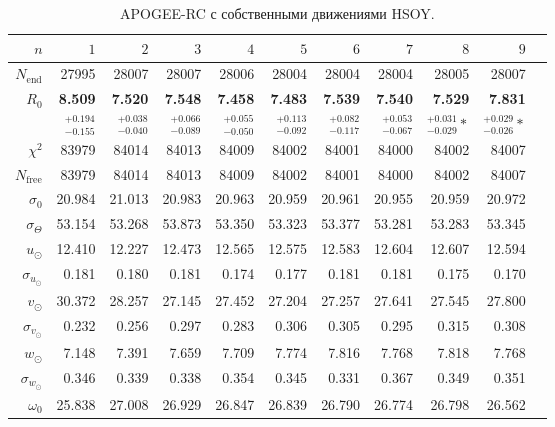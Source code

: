 \documentclass{matmex-diploma-custom}
\begin{document}
\pagebreak
\begin{table}[h!!] \label{table_hsoy_sigma0}
\centering
\caption{APOGEE-RC с собственными движениями HSOY.}
\begin{tabular}{r|rr|r|r|r|rrrrr}
\hline
$n$ & $1$ & $2$ & $3$ & $4$ & $5$&$ 6 $&$ 7 $&$ 8 $&$ 9 $\\\hline
 $N_{\mathrm{end}}$ & 27995       &    28007 &   28007 &   28006 &   28004 &   28004 &    28004 &   28005 &   28007 \\
 $R_0 $& \textbf{8.509}       &     \textbf{7.520} &   \textbf{7.548} &   \textbf{7.458} &   \textbf{7.483} &   \textbf{7.539} &     \textbf{7.540} &   \textbf{7.529} &   \textbf{7.831} \\
       & $_{-0.155}^{+0.194} $ & $_{-0.040}^{+0.038}$ & $_{-0.089}^{+0.066}$   & $_{-0.050}^{+0.055}$  & $_{-0.092}^{+0.113}$  & $_{-0.117}^{+0.082}$  & $_{-0.067}^{+0.053}$  & $_{-0.029}^{+0.031} *$  & $_{-0.026}^{+0.029} *$  \\\hline
 $\chi^2 $& 83979   &  84014 &   84013 &   84009 &   84002 &   84001 &  84000 &   84002 &   84007 \\
 $N_{\mathrm{free}} $& 83979   &  84014 &   84013 &   84009 &   84002 &   84001 &  84000 &   84002 &   84007 \\
 $\sigma_0 $& 20.984      &  21.013 &  20.983 &  20.963 &  20.959 &  20.961 &  20.955 &  20.959 &  20.972  \\ 
 $\sigma_{\Theta} $& 53.154      &  53.268 &  53.873 &  53.350 &  53.323 &  53.377 &  53.281 &  53.283 &  53.345  \\\hline 
 $ u_{\odot} $& 12.410      &   12.227 &  12.473 &  12.565 &  12.575 &  12.583 &   12.604 &  12.607 &  12.594 \\
 $\sigma_{u_{\odot}} $&0.181       &     0.180 &   0.181 &   0.174 &   0.177 &   0.181 &    0.181 &   0.175 &    0.170 \\
 $v_{\odot} $& 30.372      &   28.257 &  27.145 &  27.452 &  27.204 &  27.257 &   27.641 &  27.545 &    27.800 \\
 $\sigma_{v_{\odot}}$&0.232       &    0.256 &   0.297 &   0.283 &   0.306 &   0.305 &    0.295 &   0.315 &   0.308 \\
 $w_{\odot} $& 7.148       &    7.391 &   7.659 &   7.709 &   7.774 &   7.816 &    7.768 &   7.818 &   7.768 \\
 $\sigma_{w_{\odot}}$&0.346       &    0.339 &   0.338 &   0.354 &   0.345 &   0.331 &    0.367 &   0.349 &   0.351 \\
 $\omega_0 $&25.838      &   27.008 &  26.929 &  26.847 &  26.839 &   26.790 &   26.774 &  26.798 &  26.562 \\

\end{tabular}
\end{table}
\end{document}
